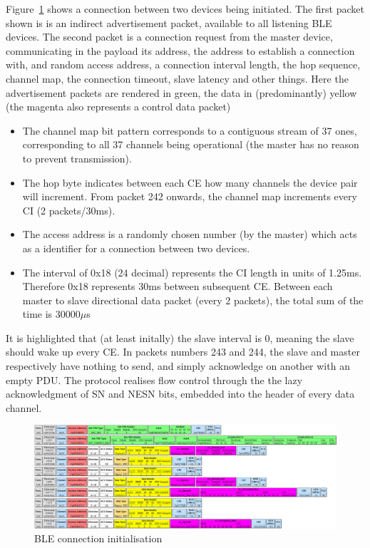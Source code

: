 \documentclass[]{article}
\begin{document}
Figure~\ref{fig:connection} shows a connection between two devices being initiated. The first packet shown is is an indirect advertisement packet, available to all listening \ac{BLE} devices. The second packet is a connection request from the master device, communicating in the payload its address, the address to establish a connection with, and random access address, a connection interval length, the hop sequence, channel map, the connection timeout, slave latency and other things. Here the advertisement packets are rendered in green, the data in (predominantly) yellow (the magenta also represents a control data packet)
\begin{itemize}

 \item The channel map bit pattern corresponds to a contiguous stream of 37 ones, corresponding to all 37 channels being operational (the master has no reason to prevent transmission). 
 \item The hop byte indicates between each \ac{CE} how many channels the device pair will increment. From packet 242 onwards, the channel map increments every \ac{CI} (2 packets/30ms).
 \item The access address is a randomly chosen number (by the master) which acts as a identifier for a connection between two devices. 
 \item The interval of 0x18 (24 decimal) represents the \ac{CI} length in units of 1.25ms. Therefore 0x18 represents 30ms between subsequent \ac{CE}. Between each master to slave directional data packet (every 2 packets), the total sum of the time is 30000$\mu$s

\end{itemize}

It is highlighted that (at least initally) the slave interval is 0, meaning the slave should wake up every \ac{CE}. In packets numbers 243 and 244, the slave and master respectively have nothing to send, and simply acknowledge on another with an empty \ac{PDU}. The protocol realises flow control through the the lazy acknowledgment of \ac{SN} and \ac{NESN} bits, embedded into the header of every data channel.

\begin{figure}[!h]
	\begin{center}
		\includegraphics[width = 1.4\textwidth, angle=90]{connection}
	\end{center}
	\caption{\ac{BLE} connection initialisation}
	\label{fig:connection}
\end{figure}
\end{document}
